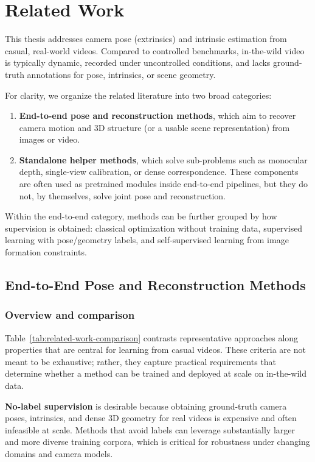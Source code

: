 \chapter{Related Work}\label{chapter:related-work}

This thesis addresses camera pose (extrinsics) and intrinsic estimation from casual, real-world videos. Compared to controlled benchmarks, in-the-wild video is typically dynamic, recorded under uncontrolled conditions, and lacks ground-truth annotations for pose, intrinsics, or scene geometry.

For clarity, we organize the related literature into two broad categories:
\begin{enumerate}
    \item \textbf{End-to-end pose and reconstruction methods}, which aim to recover camera motion and 3D structure (or a usable scene representation) from images or video.
    \item \textbf{Standalone helper methods}, which solve sub-problems such as monocular depth, single-view calibration, or dense correspondence. These components are often used as pretrained modules inside end-to-end pipelines, but they do not, by themselves, solve joint pose and reconstruction.
\end{enumerate}

Within the end-to-end category, methods can be further grouped by how supervision is obtained: classical optimization without training data, supervised learning with pose/geometry labels, and self-supervised learning from image formation constraints.

\section{End-to-End Pose and Reconstruction Methods}
\label{sec:rw_end_to_end}

\subsection{Overview and comparison}
Table~\ref{tab:related-work-comparison} contrasts representative approaches along properties that are central for learning from casual videos. These criteria are not meant to be exhaustive; rather, they capture practical requirements that determine whether a method can be trained and deployed at scale on in-the-wild data.

\textbf{No-label supervision} is desirable because obtaining ground-truth camera poses, intrinsics, and dense 3D geometry for real videos is expensive and often infeasible at scale. Methods that avoid labels can leverage substantially larger and more diverse training corpora, which is critical for robustness under changing domains and camera models.

